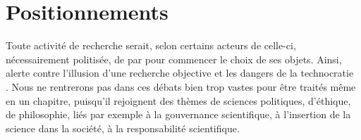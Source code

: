 



\chapter{Positionnements}


\label{ch:positioning} %



\bigskip


Toute activité de recherche serait, selon certains acteurs %
de celle-ci, nécessairement politisée, de par pour commencer le choix de ses objets. Ainsi,  alerte contre l'illusion d'une recherche objective et les dangers de la technocratie~\cite{ripoll2017jig} %
. Nous ne rentrerons pas dans ces débats bien trop vastes pour être traités même en un chapitre, puisqu'il rejoignent des thèmes de sciences politiques, d'éthique, de philosophie, liés par exemple à la gouvernance scientifique, à l'insertion de la science dans la société, à la responsabilité scientifique. %


